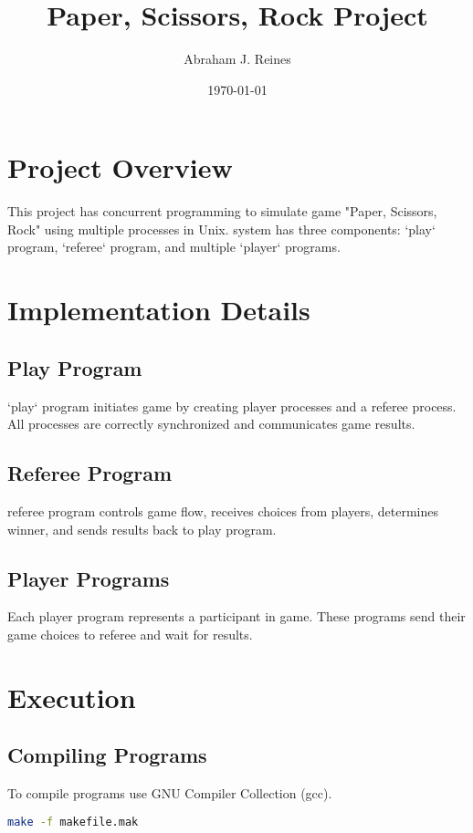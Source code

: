 \documentclass{article}
\title{Paper, Scissors, Rock Project}
\author{Abraham J. Reines}
\date{\today}
\begin{document}
\maketitle

\section{Project Overview}
This project has concurrent programming to simulate game "Paper, Scissors, Rock" using multiple processes in Unix. system has three components: `play` program, `referee` program, and multiple `player` programs. 

\section{Implementation Details}
\subsection{Play Program}
`play` program initiates game by creating player processes and a referee process. All processes are correctly synchronized and communicates game results.

\subsection{Referee Program}
referee program controls game flow, receives choices from players, determines winner, and sends results back to play program.

\subsection{Player Programs}
Each player program represents a participant in game. These programs send their game choices to referee and wait for results.

\section{Execution}
\subsection{Compiling Programs}
To compile programs use GNU Compiler Collection (gcc). 

\begin{lstlisting}[language=bash]
make -f makefile.mak
\end{lstlisting}
\end{document}
